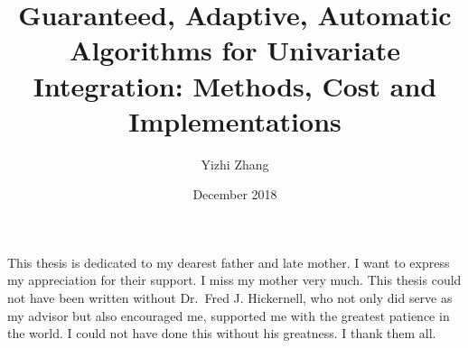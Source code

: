 \documentclass{iitthesis}
\theoremstyle{definition}
\theoremstyle{remark}
\begin{document}
\title{Guaranteed, Adaptive, Automatic Algorithms for Univariate Integration: Methods, Cost and Implementations}
\author{Yizhi Zhang}
\date{December 2018}
\copyrightnoticefalse      %
\maketitle                %


\prelimpages         %


\begin{acknowledgement}     %
\par  This thesis is dedicated to my dearest father and late mother. I want to express my appreciation for their support. I miss my mother very much. This thesis could not have been written without Dr.\ Fred J. Hickernell, who not only did serve as my advisor but also encouraged me, supported me with the greatest patience in the world. I could not have done this without his greatness. I thank them all.
\end{acknowledgement}


\tableofcontents
\clearpage

\listoftables

\clearpage

\listoffigures

\clearpage
%
%
%
\end{document}
